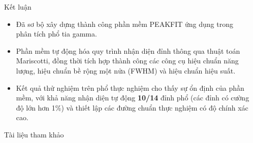\documentclass[final]{beamer}
\newlength{\sepwidth}
\newlength{\rightcolwidth} %
\newcommand{\separatorcolumn}{\begin{column}{\sepwidth}\end{column}}
\begin{document}
\begin{frame}[t]
\begin{columns}[t]
\begin{column}{\rightcolwidth}
			\begin{block}{Kết luận}
			\begin{itemize}
				\item Đã sơ bộ xây dựng thành công phần mềm PEAKFIT ứng dụng trong phân tích phổ tia gamma.
				\item Phần mềm tự động hóa quy trình nhận diện đỉnh thông qua thuật toán Mariscotti, đồng thời tích hợp thành công các công cụ hiệu chuẩn năng lượng, hiệu chuẩn bề rộng một nửa (FWHM) và hiệu chuẩn hiệu suất. 
				\item Kết quả thử nghiệm trên phổ thực nghiệm cho thấy sự ổn định của phần mềm, với khả năng nhận diện tự động {\bf 10/14} đỉnh phổ (các đỉnh có cường độ lớn hơn 1\%) và thiết lập các đường chuẩn thực nghiệm có độ chính xác cao.
			\end{itemize}	
			\end{block}
			
			
			\begin{block}{Tài liệu tham khảo}
				\printbibliography[heading=none]
			\end{block}
		\end{column}
		
		\separatorcolumn
	\end{columns}
\end{frame}
\end{document}
